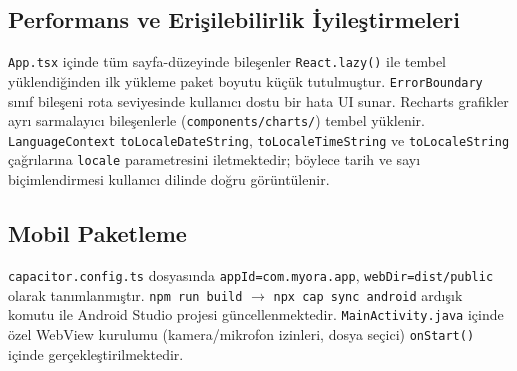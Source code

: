 \subsection{Performans ve Erişilebilirlik İyileştirmeleri}

\texttt{App.tsx} içinde tüm sayfa-düzeyinde bileşenler \texttt{React.lazy()} ile tembel yüklendiğinden ilk yükleme paket boyutu küçük tutulmuştur. \texttt{ErrorBoundary} sınıf bileşeni rota seviyesinde kullanıcı dostu bir hata UI sunar. Recharts grafikler ayrı sarmalayıcı bileşenlerle (\texttt{components/charts/}) tembel yüklenir. \texttt{LanguageContext} \texttt{toLocaleDateString}, \texttt{toLocaleTimeString} ve \texttt{toLocaleString} çağrılarına \texttt{locale} parametresini iletmektedir; böylece tarih ve sayı biçimlendirmesi kullanıcı dilinde doğru görüntülenir.

\subsection{Mobil Paketleme}

\texttt{capacitor.config.ts} dosyasında \texttt{appId=com.myora.app}, \texttt{webDir=dist/public} olarak tanımlanmıştır. \texttt{npm run build} \texttt{$\rightarrow$} \texttt{npx cap sync android} ardışık komutu ile Android Studio projesi güncellenmektedir. \texttt{MainActivity.java} içinde özel WebView kurulumu (kamera/mikrofon izinleri, dosya seçici) \texttt{onStart()} içinde gerçekleştirilmektedir.
